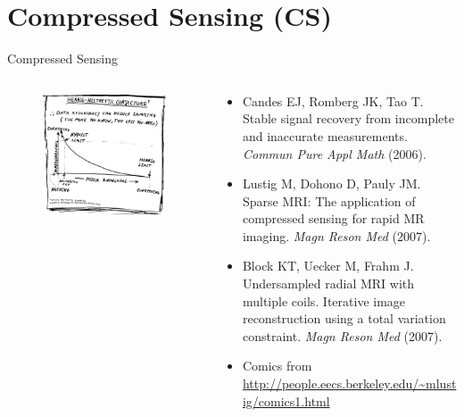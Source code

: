 \section{Compressed Sensing (CS)}

\begin{frame}{Compressed Sensing}

	\begin{columns}
		\begin{column}{0.45\textwidth}
			\begin{figure}
				\includegraphics[width=\columnwidth]{fig/comics_02.png}
			\end{figure}
		\end{column}

		\begin{column}{0.55\textwidth}
			\begin{itemize}
				\item Candes EJ, Romberg JK, Tao T. Stable signal recovery from incomplete and inaccurate measurements. \textit{Commun Pure Appl Math} (2006).
				\vspace{0.5em}
				\item Lustig M, Dohono D, Pauly JM. Sparse MRI: The application of compressed sensing for rapid MR imaging. \textit{Magn Reson Med} (2007).
				\vspace{0.5em}
				\item Block KT, Uecker M, Frahm J. Undersampled radial MRI with multiple coils. Iterative image reconstruction using a total variation constraint. \textit{Magn Reson Med} (2007).
				\vspace{0.5em}
				\item Comics from \url{http://people.eecs.berkeley.edu/~mlustig/comics1.html}
			\end{itemize}
			\vfill
		\end{column}
	\end{columns}
\end{frame}


